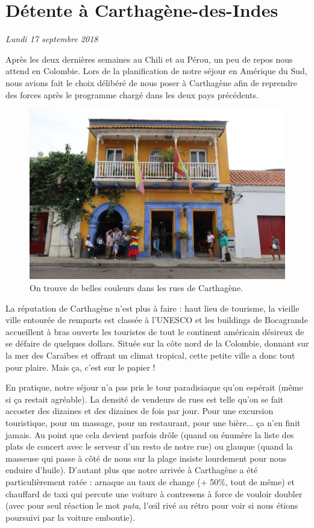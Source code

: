 \hypertarget{duxe9tente-uxe0-carthaguxe8ne-des-indes}{%
\section{Détente à
Carthagène-des-Indes}\label{duxe9tente-uxe0-carthaguxe8ne-des-indes}}

\emph{Lundi 17 septembre 2018}

Après les deux dernières semaines au Chili et au Pérou, un peu de repos
nous attend en Colombie. Lors de la planification de notre séjour en
Amérique du Sud, nous avions fait le choix délibéré de nous poser à
Carthagène afin de reprendre des forces après le programme chargé dans
les deux pays précédents.

\begin{figure}
\centering
\includegraphics{images/20180917_rue.JPG}
\caption{On trouve de belles couleurs dans les rues de Carthagène.}
\end{figure}

La réputation de Carthagène n'est plus à faire : haut lieu de tourisme,
la vieille ville entourée de remparts est classée à l'UNESCO et les
buildings de Bocagrande accueillent à bras ouverts les touristes de tout
le continent américain désireux de se défaire de quelques dollars.
Située sur la côte nord de la Colombie, donnant sur la mer des Caraïbes
et offrant un climat tropical, cette petite ville a donc tout pour
plaire. Mais ça, c'est sur le papier !

En pratique, notre séjour n'a pas pris le tour paradisiaque qu'on
espérait (même si ça restait agréable). La densité de vendeurs de rues
est telle qu'on se fait accoster des dizaines et des dizaines de fois
par jour. Pour une excursion touristique, pour un massage, pour un
restaurant, pour une bière... ça n'en finit jamais. Au point que cela
devient parfois drôle (quand on énumère la liste des plats de concert
avec le serveur d'un resto de notre rue) ou glauque (quand la masseuse
qui passe à côté de nous sur la plage insiste lourdement pour nous
enduire d'huile). D'autant plus que notre arrivée à Carthagène a été
particulièrement ratée : arnaque au taux de change (+ 50\%, tout de
même) et chauffard de taxi qui percute une voiture à contresens à force
de vouloir doubler (avec pour seul réaction le mot \emph{puta}, l'œil
rivé au rétro pour voir si nous étions poursuivi par la voiture
emboutie).

